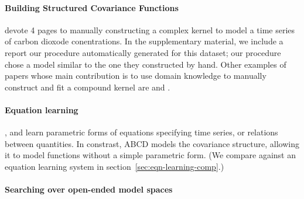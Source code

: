 \documentclass[letterpaper]{article}
\def\eg{e.g.\ }
\newcommand{\procedurename}{ABCD}
\begin{document}
\paragraph{Building Structured Covariance Functions}
\cite{rasmussen38gaussian} devote 4 pages to manually constructing a complex kernel to model a time series of carbon dioxode conentrations.
In the supplementary material, we include a report our procedure automatically generated for this dataset; our procedure chose a model similar to the one they constructed by hand.
Other examples of papers whose main contribution is to use domain knowledge to manually construct and fit a compound \gp{} kernel are \cite{klenske2012nonparametric} and \cite{lloydgefcom2012}.

\paragraph{Equation learning} 
\cite{schmidt2009distilling}, \cite{todorovski1997declarative} and \cite{washio1999discovering} learn parametric forms of equations specifying time series, or relations between quantities.
In constrast, \procedurename{} models the covariance structure, allowing it to model functions without a simple parametric form. (We compare against an equation learning system in section~\ref{sec:eqn-learning-comp}.)

\paragraph{Searching over open-ended model spaces}
\end{document}
